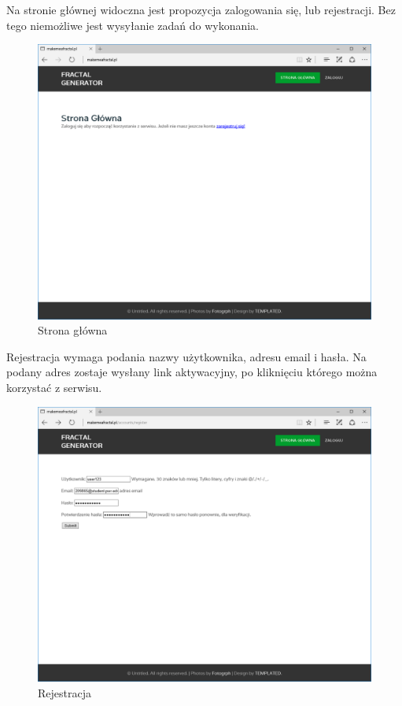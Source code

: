 \documentclass[a4paper]{article}
\begin{document}
Na stronie głównej widoczna jest propozycja zalogowania się, lub rejestracji. Bez tego niemożliwe jest wysyłanie zadań do wykonania. 
 \begin{figure}[H]
    \centering
    \includegraphics[width=\textwidth]{main_page.png}
    \caption{Strona główna}
    \label{fig:main_page}
\end{figure}
\newpage
Rejestracja wymaga podania nazwy użytkownika, adresu email i hasła. Na podany adres zostaje wysłany link aktywacyjny, po kliknięciu którego można korzystać z serwisu.
\begin{figure}[H]
    \centering
    \includegraphics[width=\textwidth]{register_page.png}
    \caption{Rejestracja}
    \label{fig:reg_page}
\end{figure}
\end{document}
